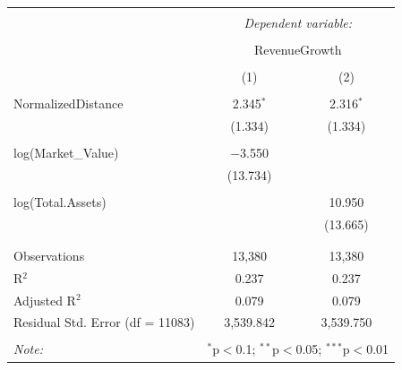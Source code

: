 \documentclass[
]{article}
\begin{document}
\begin{table}[!htbp] \centering 
  \caption{} 
  \label{} 
\begin{tabular}{@{\extracolsep{5pt}}lcc} 
\\[-1.8ex]\hline 
\hline \\[-1.8ex] 
 & \multicolumn{2}{c}{\textit{Dependent variable:}} \\ 
\cline{2-3} 
\\[-1.8ex] & \multicolumn{2}{c}{RevenueGrowth} \\ 
\\[-1.8ex] & (1) & (2)\\ 
\hline \\[-1.8ex] 
 NormalizedDistance & 2.345$^{*}$ & 2.316$^{*}$ \\ 
  & (1.334) & (1.334) \\ 
  & & \\ 
 log(Market\_Value) & $-$3.550 &  \\ 
  & (13.734) &  \\ 
  & & \\ 
 log(Total.Assets) &  & 10.950 \\ 
  &  & (13.665) \\ 
  & & \\ 
\hline \\[-1.8ex] 
Observations & 13,380 & 13,380 \\ 
R$^{2}$ & 0.237 & 0.237 \\ 
Adjusted R$^{2}$ & 0.079 & 0.079 \\ 
Residual Std. Error (df = 11083) & 3,539.842 & 3,539.750 \\ 
\hline 
\hline \\[-1.8ex] 
\textit{Note:}  & \multicolumn{2}{r}{$^{*}$p$<$0.1; $^{**}$p$<$0.05; $^{***}$p$<$0.01} \\ 
\end{tabular} 
\end{table}
\end{document}
